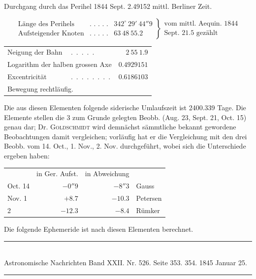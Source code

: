 \begin{center}
Durchgang durch das Perihel 1844 Sept. 2.49152 mittl. Berliner Zeit.
\end{center}
{\small
\[
\left.\begin{array}{llr}
\text{Länge des Perihels} & \text{.\ .\ .\ .\ .} & 342^\circ\ 29'\ 44''9 \\
\text{Aufsteigender Knoten} & \text{.\ .\ .\ .\ .} & 63\ 48\ 55.2
\end{array}\right\}
\begin{array}{l}
\text{vom mittl. Aequin. 1844} \\
\text{Sept. 21.5 gezählt}
\end{array}
\]
}
\begin{center}
\setlength{\tabcolsep}{4pt}
\begin{tabular}{llr}
Neigung der Bahn & \mbox{.\ .\ .\ .\ .} & $2\ 55\ 1.9$ \\
\multicolumn{2}{l}{Logarithm der halben grossen Axe} & $0.4929151$ \\
Excentricität & \mbox{.\ .\ .\ .\ .\ .\ .\ .} & $0.6186103$ \\
\multicolumn{3}{l}{Bewegung rechtläufig.}
\end{tabular}
\end{center}

Die aus diesen Elementen folgende siderische Umlaufszeit ist 2400.339 Tage. Die Elemente stellen die 3 zum Grunde gelegten Beobb. (Aug. 23, Sept. 21, Oct. 15) genau dar; Dr. \textsc{Goldschmidt} wird demnächst sämmtliche bekannt gewordene Beobachtungen damit vergleichen; vorläufig hat er die Vergleichung mit den drei Beobb. vom 14. Oct., 1. Nov., 2. Nov. durchgeführt, wobei sich die Unterschiede ergeben haben:

\begin{center}
\begin{tabular}{lrrl}
 & in Ger. Aufst. & in Abweichung & \\
Oct. 14 & $-0''9$ & $-8''3$ & Gauss \\
Nov. 1 & $+8.7$ & $-10.3$ & Petersen \\
\hfill 2 & $-12.3$ & $-8.4$ & Rümker \\
\end{tabular}
\end{center}

Die folgende Ephemeride ist nach diesen Elementen berechnet.

\clearpage
\hypertarget{native-475-lower}{}
\begin{center}
\rule{0.55\linewidth}{0.4pt}\\[2pt]
Astronomische Nachrichten Band XXII. Nr. 526. Seite 353. 354. 1845 Januar 25.\\[2pt]
\rule{0.55\linewidth}{0.4pt}
\end{center}

